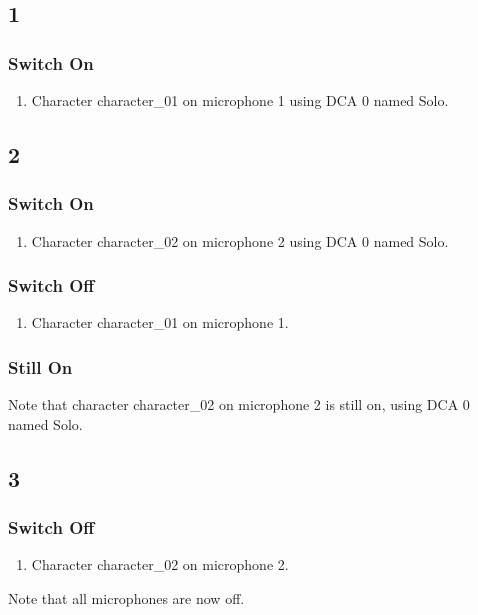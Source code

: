 \subsection* {1}
\subsubsection* {Switch On}
\begin{enumerate}
\item Character character\_01 on microphone 1 using DCA 0 named Solo.
\end{enumerate}
\subsection* {2}
\subsubsection* {Switch On}
\begin{enumerate}
\item Character character\_02 on microphone 2 using DCA 0 named Solo.
\end{enumerate}
\subsubsection* {Switch Off}
\begin{enumerate}
\item Character character\_01 on microphone 1.
\end{enumerate}
\subsubsection* {Still On}
Note that character character\_02 on microphone 2 is still on, using DCA 0 named Solo.\subsection* {3}
\subsubsection* {Switch Off}
\begin{enumerate}
\item Character character\_02 on microphone 2.
\end{enumerate}
Note that all microphones are now off.
